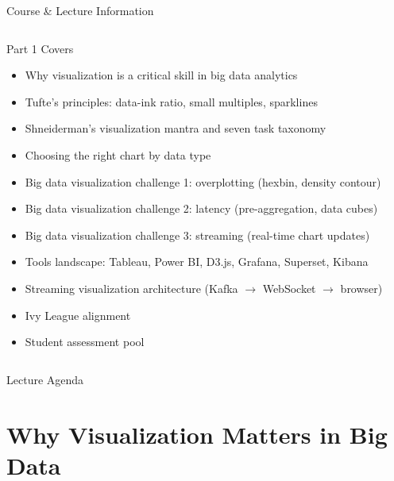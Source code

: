 \documentclass[aspectratio=169,10pt]{beamer}
\begin{document}
\begin{frame}{Course \& Lecture Information}
\begin{columns}[T]
      \begin{exampleblock}{Part 1 Covers}
        \begin{itemize}
          \item Why visualization is a critical skill in big data analytics
          \item Tufte's principles: data-ink ratio, small multiples, sparklines
          \item Shneiderman's visualization mantra and seven task taxonomy
          \item Choosing the right chart by data type
          \item Big data visualization challenge 1: overplotting (hexbin, density contour)
          \item Big data visualization challenge 2: latency (pre-aggregation, data cubes)
          \item Big data visualization challenge 3: streaming (real-time chart updates)
          \item Tools landscape: Tableau, Power BI, D3.js, Grafana, Superset, Kibana
          \item Streaming visualization architecture (Kafka $\to$ WebSocket $\to$ browser)
          \item Ivy League alignment
          \item Student assessment pool
        \end{itemize}
      \end{exampleblock}
  \end{columns}
\end{frame}

\begin{frame}{Lecture Agenda}\tableofcontents\end{frame}

\section{Why Visualization Matters in Big Data}
\end{document}
